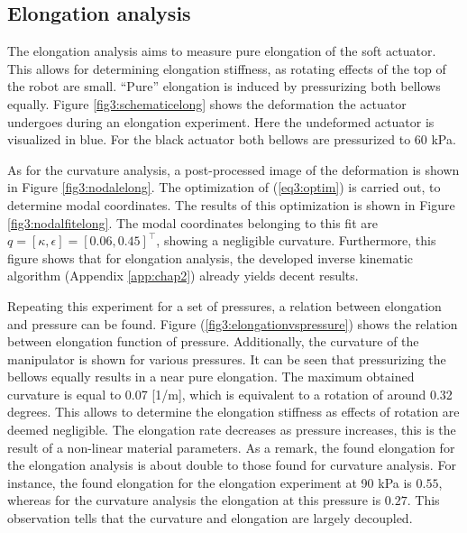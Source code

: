 \newpage





\subsection{Elongation analysis}


The elongation analysis aims to measure pure elongation of the soft actuator. This allows for determining elongation stiffness, as rotating effects of the top of the robot are small. ``Pure'' elongation is induced by pressurizing both bellows equally. Figure \ref{fig3:schematicelong} shows the deformation the actuator undergoes during an elongation experiment. Here the undeformed actuator is visualized in blue. For the black actuator both bellows are pressurized to 60 kPa. 

As for the curvature analysis, a post-processed image of the deformation is shown in Figure \ref{fig3:nodalelong}. The optimization of (\ref{eq3:optim}) is carried out, to determine modal coordinates. The results of this optimization is shown in Figure \ref{fig3:nodalfitelong}. The modal coordinates belonging to this fit are  $q = [\kappa,\epsilon] = [0.06, 0.45]^\top$, showing a negligible curvature. Furthermore, this figure shows that for elongation analysis, the developed inverse kinematic algorithm (Appendix \ref{app:chap2}) already yields decent results.  

Repeating this experiment for a set of pressures, a relation between elongation and pressure can be found. Figure (\ref{fig3:elongationvspressure}) shows the relation between elongation function of pressure. Additionally, the curvature of the manipulator is shown for various pressures. It can be seen that pressurizing the bellows equally results in a near pure elongation. The maximum obtained curvature is equal to 0.07 [1/m], which is equivalent to a rotation of around 0.32 degrees. This allows to determine the elongation stiffness as effects of rotation are deemed negligible. The elongation rate decreases as pressure increases, this is the result of a non-linear material parameters. As a remark, the found elongation for the elongation analysis is about double to those found for curvature analysis. For instance, the found elongation for the elongation experiment at 90 kPa is $0.55$, whereas for the curvature analysis the elongation at this pressure is $0.27$. This observation tells that the curvature and elongation are largely decoupled.

\newpage



